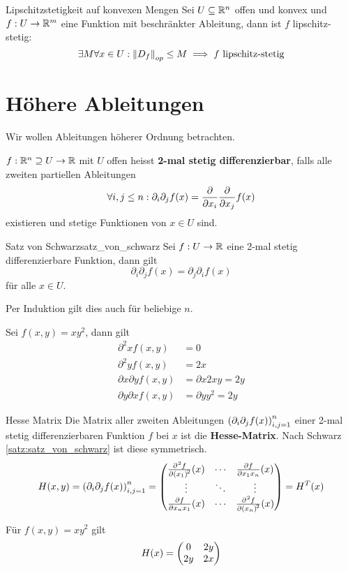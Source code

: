 \begin{satz}{Lipschitzstetigkeit auf konvexen Mengen}{}
Sei $U \subseteq \mathbb{R}^n$ offen und konvex und $f: U \to \mathbb{R}^m$ eine Funktion mit beschränkter Ableitung, dann ist $f$ lipschitz-stetig:
$$\exists M \forall x \in U: \left\|D_f\right\|_{op} \leq M \implies f \text{ lipschitz-stetig}$$
\end{satz}

\section{Höhere Ableitungen}
Wir wollen Ableitungen höherer Ordnung betrachten.

$f: \mathbb{R}^n \supseteq U \to \mathbb{R}$ mit $U$ offen heisst \textbf{2-mal stetig differenzierbar}, falls alle zweiten partiellen Ableitungen 
$$\forall i,j \leq n: \partial_i \partial_j f(x) = \diffp{}{x_i}\diffp{}{x_j} f(x)$$
existieren und stetige Funktionen von $x \in U$ sind.

\begin{satz}{Satz von Schwarz}{satz_von_schwarz}
Sei $f: U \to \mathbb{R}$ eine 2-mal stetig differenzierbare Funktion, dann gilt
$$\partial_i \partial_j f(x) = \partial_j \partial_i f(x)$$
für alle $x \in U$.
\end{satz}
Per Induktion gilt dies auch für beliebige $n$.

\begin{example}
Sei $f(x,y) = xy^2$, dann gilt
\begin{align*}
    \partial^2x f(x,y) &= 0\\
    \partial^2y f(x,y) &= 2x\\
    \partial x \partial y f(x,y) &= \partial x 2xy = 2y\\
    \partial y \partial x f(x,y) &= \partial y y^2 = 2y
\end{align*}
\end{example}
  
\begin{definition}{Hesse Matrix}{}
Die Matrix aller zweiten Ableitungen $\left(\partial_i\partial_j f(x)\right)_{i,j = 1}^n$ einer 2-mal stetig differenzierbaren Funktion $f$ bei $x$ ist die \textbf{Hesse-Matrix}. Nach Schwarz \ref{satz:satz_von_schwarz} ist diese symmetrisch.
$$H(x,y) = \bk{\partial_i\partial_j f(x)}_{i,j = 1}^n = \mat{
\diffp[2]{f}{x_1}(x) & \cdots & \diffp{f}{{x_1}{x_n}}(x)\\
\vdots & \ddots & \vdots\\
\diffp{f}{{x_n}{x_1}}(x) & \cdots & \diffp[2]{f}{x_n}(x)
} = H^T(x)$$
\end{definition}
\begin{example}
Für $f(x,y) = xy^2$ gilt 
$$H(x) = \begin{pmatrix}0 & 2y\\2y & 2x\end{pmatrix} $$
\end{example}

